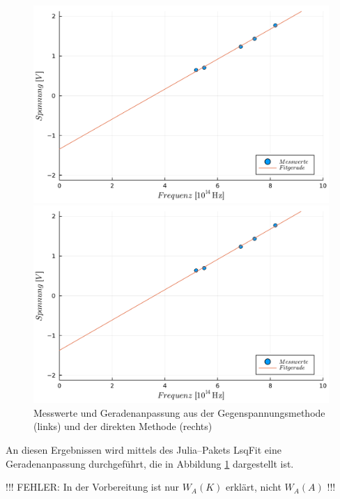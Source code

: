 \documentclass[12pt,a4paper]{scrartcl}
\numberwithin{equation}{section} %
\newcommand{\code}[1]{\textsf{#1}}
\begin{document}
\begin{figure}[h!]
	\begin{minipage}{0.5\textwidth}
		\includegraphics[width=\linewidth]{../media/B1.4/gegenPlot.pdf}
	\end{minipage}
	\begin{minipage}{0.5\textwidth}
		\includegraphics[width=\linewidth]{../media/B1.4/direktPlot.pdf}
	\end{minipage}
	\caption{Messwerte und Geradenanpassung aus der Gegenspannungsmethode (links) und der direkten Methode (rechts)}
	\label{fig:fitGeraden}
\end{figure}

\noindent
An diesen Ergebnissen wird mittels des \code{Julia}--Pakets \code{LsqFit} \cite{Julia:LsqFit} eine Geradenanpassung durchgeführt, die in Abbildung \ref{fig:fitGeraden} dargestellt ist.

!!! FEHLER: In der Vorbereitung ist nur $W_A(K)$ erklärt, nicht $W_A(A)$ !!!
\end{document}
